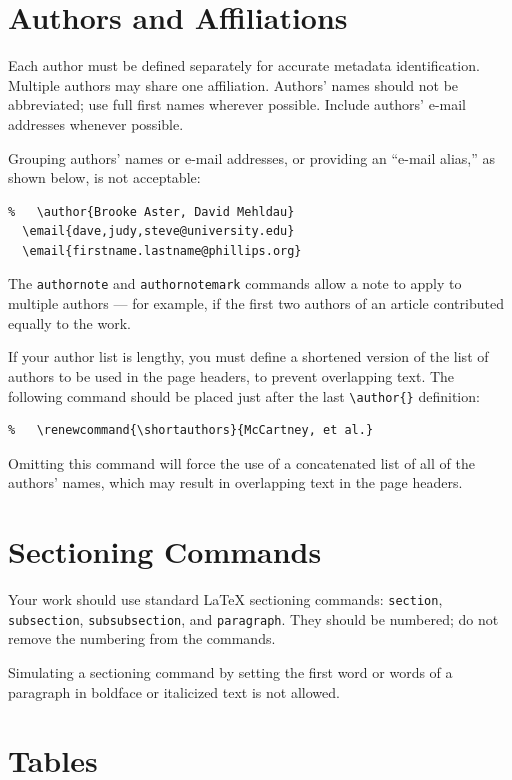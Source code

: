 \documentclass[
]{ceurart}
\begin{document}
\section{Authors and Affiliations}

Each author must be defined separately for accurate metadata
identification. Multiple authors may share one affiliation. Authors'
names should not be abbreviated; use full first names wherever
possible. Include authors' e-mail addresses whenever possible.

Grouping authors' names or e-mail addresses, or providing an ``e-mail
alias,'' as shown below, is not acceptable:
\begin{verbatim}
%   \author{Brooke Aster, David Mehldau}
  \email{dave,judy,steve@university.edu}
  \email{firstname.lastname@phillips.org}
\end{verbatim}

The \verb|authornote| and \verb|authornotemark| commands allow a note
to apply to multiple authors --- for example, if the first two authors
of an article contributed equally to the work.

If your author list is lengthy, you must define a shortened version of
the list of authors to be used in the page headers, to prevent
overlapping text. The following command should be placed just after
the last \verb|\author{}| definition:
\begin{verbatim}
%   \renewcommand{\shortauthors}{McCartney, et al.}
\end{verbatim}
Omitting this command will force the use of a concatenated list of all
of the authors' names, which may result in overlapping text in the
page headers.

\section{Sectioning Commands}

Your work should use standard \LaTeX{} sectioning commands:
\verb|section|, \verb|subsection|, \verb|subsubsection|, and
\verb|paragraph|. They should be numbered; do not remove the numbering
from the commands.

Simulating a sectioning command by setting the first word or words of
a paragraph in boldface or italicized text is not allowed.

\section{Tables}
\end{document}
